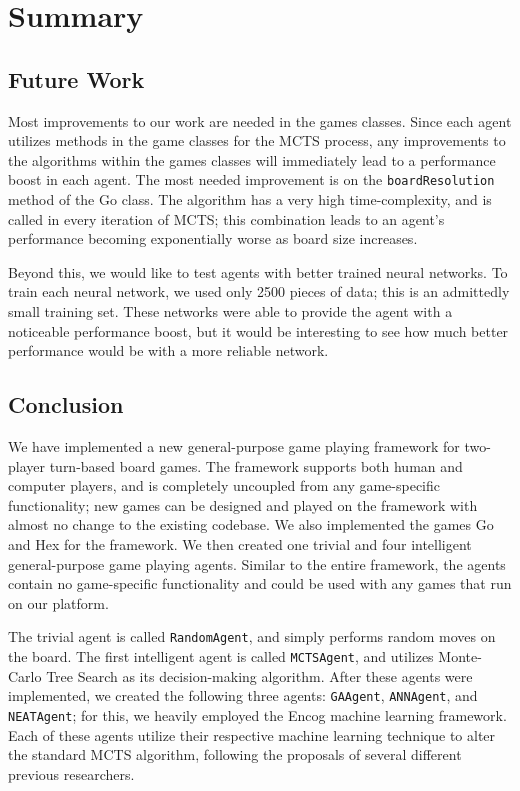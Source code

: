 %
%
%

\chapter{Summary}\label{ch:conclusion}
\section{Future Work}
Most improvements to our work are needed in the games classes.  Since each agent utilizes methods in the game classes for the MCTS process, any improvements to the algorithms within the games classes will immediately lead to a performance boost in each agent.  The most needed improvement is on the \texttt{boardResolution} method of the Go class.  The algorithm has a very high time-complexity, and is called in every iteration of MCTS; this combination leads to an agent's performance becoming exponentially worse as board size increases.

Beyond this, we would like to test agents with better trained neural networks.  To train each neural network, we used only 2500 pieces of data; this is an admittedly small training set.  These networks were able to provide the agent with a noticeable performance boost, but it would be interesting to see how much better performance would be with a more reliable network.

\section{Conclusion}
We have implemented a new general-purpose game playing framework for two-player turn-based board games.  The framework supports both human and computer players, and is completely uncoupled from any game-specific functionality; new games can be designed and played on the framework with almost no change to the existing codebase.  We also implemented the games Go and Hex for the framework.  We then created one trivial and four intelligent general-purpose game playing agents.  Similar to the entire framework, the agents contain no game-specific functionality and could be used with any games that run on our platform.

The trivial agent is called \texttt{RandomAgent}, and simply performs random moves on the board.  The first intelligent agent is called \texttt{MCTSAgent}, and utilizes Monte-Carlo Tree Search as its decision-making algorithm.  After these agents were implemented, we created the following three agents: \texttt{GAAgent}, \texttt{ANNAgent}, and \texttt{NEATAgent}; for this, we heavily employed the Encog machine learning framework.  Each of these agents utilize their respective machine learning technique to alter the standard MCTS algorithm, following the proposals of several different previous researchers.

